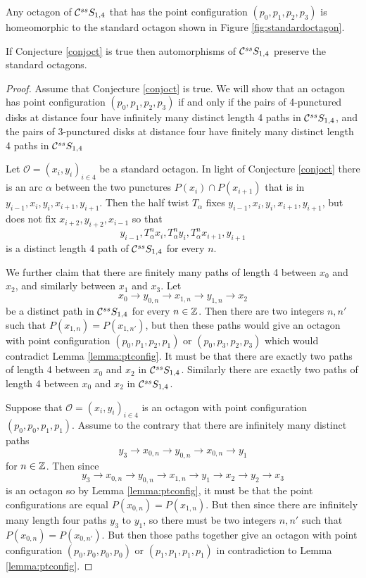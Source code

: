 \begin{conjecture}
 Any octagon of $ \mathcal C^{{ss}}  S_{1,4}$ that has the point configuration
 $(p_0,p_1,p_2,p_3)$ is homeomorphic to the standard octagon
 shown in Figure \ref{fig:standardoctagon}.
 \label{conjoct}
\end{conjecture}

\begin{lemma}
  If Conjecture \ref{conjoct} is true then automorphisms of $ \mathcal C^{{ss}}  S_{1,4}$
  preserve the standard octagons.
  \label{lemma:stdoctpres}
\end{lemma}

\begin{proof}
  Assume that Conjecture \ref{conjoct} is true.
  We will show that an octagon has point configuration $(p_0,p_1,p_2,p_3)$
  if and only if the pairs of 4-punctured disks at distance four
  have infinitely many
  distinct length 4 paths in $ \mathcal C^{{ss}}  S_{1,4}$, and
  the pairs of 3-punctured disks at distance four
  have finitely many
  distinct length 4 paths in $ \mathcal C^{{ss}}  S_{1,4}$

  Let $\mathcal O =(x_i,y_i)_{i \in 4}$ be a standard octagon.
  In light of Conjecture \ref{conjoct} there is an arc $\alpha$ between the
  two punctures $P(x_i)\cap P(x_{i+1})$ that is in $y_{i-1}, x_i, y_i, x_{i+1}, y_{i+1}$.
  Then the half twist $T_\alpha$ fixes $y_{i-1}, x_i, y_i, x_{i+1}, y_{i+1}$, but
  does not fix $x_{i+2}, y_{i+2}, x_{i-1}$ so that
  $$
  y_{i-1}, T^n_\alpha x_i, T^n_\alpha y_i, T^n_\alpha x_{i+1}, y_{i+1}
  $$
  is a distinct length 4 path of $ \mathcal C^{{ss}}  S_{1,4}$ for every $n$.

  We further claim that there are finitely many paths of length 4 between $x_0$ and $x_2$, and similarly between $x_1$ and $x_3$.
  Let $$x_0 \to y_{0,n} \to x_{1,n} \to y_{1,n} \to x_2$$ be a distinct path in $ \mathcal C^{{ss}}  S_{1,4}$
  for every $n \in \mathbb{Z}$.
  Then there are two integers $n,n'$ such that $P(x_{1,n})=P(x_{1,n'})$,
  but then these paths would give an octagon with point configuration
  $(p_0,p_1,p_2,p_1)$ or $(p_0,p_3,p_2,p_3)$ which would contradict Lemma \ref{lemma:ptconfig}.
  It must be that there are exactly two paths of length 4 between $x_0$ and $x_2$ in $ \mathcal C^{{ss}}  S_{1,4}$.
  Similarly there are exactly two paths of length 4 between $x_0$ and $x_2$ in $ \mathcal C^{{ss}}  S_{1,4}$.

  Suppose that $\mathcal O =(x_i,y_i)_{i \in 4}$ is an octagon with point configuration
  $(p_0,p_0,p_1,p_1)$.
  Assume to the contrary that
  there are infinitely many distinct paths
  $$
  y_3 \to x_{0,n} \to y_{0,n} \to x_{0,n} \to y_1
  $$
  for $n \in \mathbb{Z}$.
  Then since
  $$
  y_3\to x_{0,n}\to y_{0,n} \to x_{1,n} \to y_1 \to x_2 \to y_2 \to x_3
  $$
  is an octagon so by Lemma
  \ref{lemma:ptconfig}, it must be that
  the point configurations are equal $P(x_{0,n})=P(x_{1,n})$.
  But then since there are infinitely many length four paths $y_3$ to $y_1$,
  so there must be two integers $n,n'$ such that $P(x_{0,n})=P(x_{0,n'})$.
  But then those paths together give an octagon with point configuration
  $(p_0,p_0,p_0,p_0)$ or $(p_1,p_1,p_1,p_1)$ in contradiction to Lemma \ref{lemma:ptconfig}.


\end{proof}
